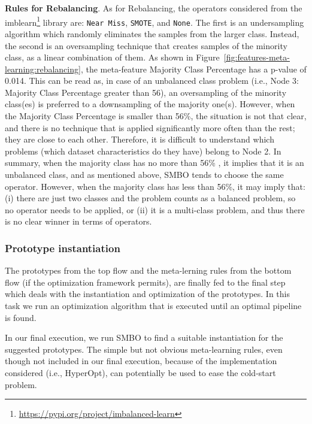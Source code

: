 \begin{example}
\textbf{Rules for Rebalancing}. As for Rebalancing, the operators considered from the imblearn\footnote{\url{https://pypi.org/project/imbalanced-learn}} library are: \texttt{Near Miss}, \texttt{SMOTE}, and \texttt{None}. %
The first is an undersampling algorithm which randomly eliminates the samples from the larger class.
Instead, the second is an oversampling technique that creates samples of the minority class, as a linear combination of them.
As shown in Figure~\ref{fig:features-meta-learning:rebalancing}, the meta-feature Majority Class Percentage has a p-value of 0.014.
This can be read as, in case of an unbalanced class problem (i.e., Node 3: Majority Class Percentage greater than 56), an oversampling of the minority class(es) is preferred to a downsampling of the majority one(s).
However, when the Majority Class Percentage is smaller than 56\%, the situation is not that clear, and there is no technique that is applied significantly more often than the rest; they are close to each other.
Therefore, it is difficult to understand which problems (which dataset characteristics do they have) belong to Node 2.
In summary, when the majority class has no more than 56\% , it implies that it is an unbalanced class, and as mentioned above, SMBO tends to choose the same operator. However, when the majority class has less than 56\%, it may imply that: (i) there are just two classes and the problem counts as a balanced problem, so no operator needs to be applied, or (ii) it is a multi-class problem, and thus there is no clear winner in terms of operators. 
\end{example}


\subsubsection{Prototype instantiation}

The prototypes from the top flow and the meta-lerning rules from the bottom flow (if the optimization framework permits), are finally fed to the final step which deals with the instantiation and optimization of the prototypes. In this task we run an optimization algorithm that is executed until an optimal pipeline is found.

\begin{example}
 In our final execution, we run SMBO to find a suitable instantiation for the suggested prototypes. The simple but not obvious meta-learning rules, even though not included in our final execution, because of the implementation considered (i.e., HyperOpt), can potentially be used to ease the cold-start problem. 
\end{example}

